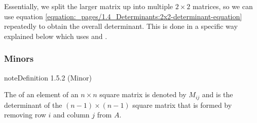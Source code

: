 \documentclass[letterpaper,10pt,english]{jupyterBook}
\begin{document}
\sphinxAtStartPar
Essentially, we split the larger matrix up into multiple \(2\times 2\) matrices, so we can use equation \eqref{equation:_pages/1.4_Determinants:2x2-determinant-equation} repeatedly to obtain the overall determinant. This is done in a specific way explained below which uses  and .


\subsubsection{Minors}
\label{\detokenize{_pages/1.4_Determinants:minors}}
\ignorespaces \label{_pages/1.4_Determinants:minor-definition}
\begin{sphinxadmonition}{note}{Definition 1.5.2 (Minor)}



\sphinxAtStartPar
The  of an element of an \(n \times n\) square matrix is denoted by \(M_{ij}\) and is the determinant of the \((n-1) \times (n-1)\) square matrix that is formed by removing row \(i\) and column \(j\) from \(A\).
\end{sphinxadmonition}
\end{document}
